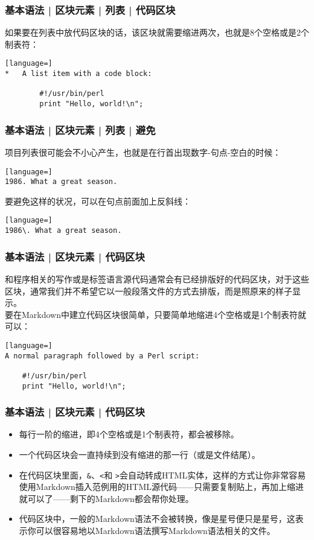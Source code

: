 \begin{frame}[fragile]
  \frametitle{基本语法 | 区块元素 | 列表 | 代码区块}
  如果要在列表中放代码区块的话，该区块就需要缩进两次，也就是8个空格或是2个制表符：
\begin{lstlisting}[language=]
*   A list item with a code block:

        #!/usr/bin/perl
        print "Hello, world!\n";
\end{lstlisting}
\end{frame}

\begin{frame}[fragile]
  \frametitle{基本语法 | 区块元素 | 列表 | 避免}
  项目列表很可能会不小心产生，也就是在行首出现数字-句点-空白的时候：
\begin{lstlisting}[language=]
1986. What a great season.
\end{lstlisting}
\pause
  要避免这样的状况，可以在句点前面加上反斜线：
\begin{lstlisting}[language=]
1986\. What a great season.
\end{lstlisting}
\end{frame}

\begin{frame}[fragile]
  \frametitle{基本语法 | 区块元素 | \alert{代码区块}}
和程序相关的写作或是标签语言源代码通常会有已经排版好的代码区块，对于这些区块，通常我们并不希望它以一般段落文件的方式去排版，而是照原来的样子显示。\\
  \vspace{1em}
  要在Markdown中建立代码区块很简单，只要简单地缩进4个空格或是1个制表符就可以：
\begin{lstlisting}[language=]
A normal paragraph followed by a Perl script:

    #!/usr/bin/perl
    print "Hello, world!\n";
\end{lstlisting}
\end{frame}

\begin{frame}[fragile]
  \frametitle{基本语法 | 区块元素 | 代码区块}
  \begin{itemize}
    \item 每行一阶的缩进，即4个空格或是1个制表符，都会被移除。
    \item 一个代码区块会一直持续到没有缩进的那一行（或是文件结尾）。
    \item 在代码区块里面，\verb|&|、\verb|<|和 \verb|>|会自动转成HTML实体，这样的方式让你非常容易使用Markdown插入范例用的HTML源代码——只需要复制贴上，再加上缩进就可以了——剩下的Markdown都会帮你处理。
    \item 代码区块中，一般的Markdown语法不会被转换，像是星号便只是星号，这表示你可以很容易地以Markdown语法撰写Markdown语法相关的文件。
  \end{itemize}
\end{frame}

